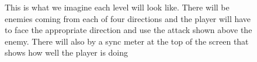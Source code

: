 \documentclass[]{article}
\begin{document}
\begin{figure}[!htb]
\begin{center}
\leavevmode
{}
\end{center}
\caption{ This is what we imagine each level will look like. There
will be enemies coming from each of four directions and the player
will have to face the appropriate direction and use the attack shown
above the enemy. There will also by a sync meter at the top of the
screen that shows how well the player is doing\label{play_sketch}}
\end{figure}
\end{document}
